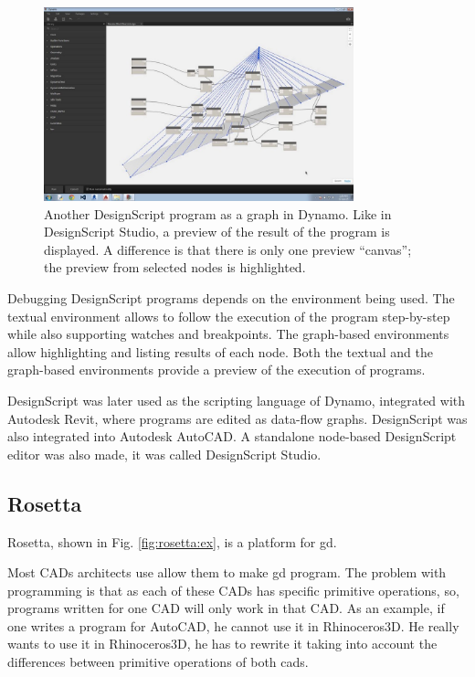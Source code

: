 \begin{figure}
	\centering
	\includegraphics[width=0.8\textwidth]{images/ds_dynamo}
	\caption{Another DesignScript program as a graph in Dynamo. Like in DesignScript Studio, a preview of the result of the program is displayed. A difference is that there is only one preview ``canvas''; the preview from selected nodes is highlighted.}
	\label{fig:ds:dynamo}
\end{figure}

Debugging DesignScript programs depends on the environment being used.
The textual environment allows to follow the execution of the program step-by-step while also supporting watches and breakpoints.
The graph-based environments allow highlighting and listing results of each node.
Both the textual and the graph-based environments provide a preview of the execution of programs.

DesignScript was later used as the scripting language of Dynamo, integrated with Autodesk Revit, where programs are edited as data-flow graphs.
DesignScript was also integrated into Autodesk AutoCAD.
A standalone node-based DesignScript editor was also made, it was called DesignScript Studio.


\subsection{Rosetta}
\label{section:rosetta:related}
Rosetta\cite{de2012modern,lopes2011portable}, shown in Fig. \ref{fig:rosetta:ex}, is a platform for \gls{gd}.

Most CADs architects use allow them to make \gls{gd} program.
The problem with programming is that as each of these CADs has specific primitive operations, so, programs written for one CAD will only work in that CAD.
As an example, if one writes a program for AutoCAD, he cannot use it in Rhinoceros3D.
He really wants to use it in Rhinoceros3D, he has to rewrite it taking into account the differences between primitive operations of both \glspl{cad}.

